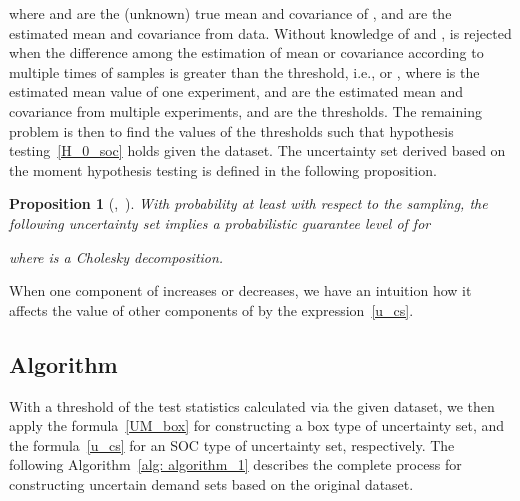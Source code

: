 \documentclass[10pt,twocolumn,twoside,english]{IEEEtran}
\newtheorem{proposition}{Proposition}
\begin{document}
where  and  are the (unknown) true mean and covariance of ,   and  are the estimated mean and covariance from data. Without knowledge of  and ,  is rejected when the difference among the estimation of mean or covariance according to multiple times of samples is greater than the threshold, i.e.,  or , where  is the estimated mean value of one experiment,  and  are the estimated mean and covariance from multiple experiments,  and  are the thresholds. The remaining problem is then to find the values of the thresholds such that hypothesis testing~\eqref{H_0_soc} holds given the dataset. The uncertainty set derived based on the moment hypothesis testing is defined in the following proposition.
\begin{proposition}[\cite{datad_robust},~\cite{SC_2003}]
With probability at least  with respect to the sampling, the following uncertainty set  implies a probabilistic guarantee level of  for  

where  is a Cholesky decomposition. 
\label{theorem_10}
\end{proposition} 
When one component of  increases or decreases, we have an intuition how it affects the value of other components of  by the expression~\eqref{u_cs}.



\subsection{Algorithm}
\label{algorithm_sec}
With a threshold of the test statistics calculated via the given dataset, we then apply the formula~\eqref{UM_box} for constructing a box type of uncertainty set, and the formula~\eqref{u_cs} for an SOC type of uncertainty set, respectively. The following Algorithm~\ref{alg: algorithm_1} describes the complete process for constructing uncertain demand sets based on the original dataset.
\end{document}
